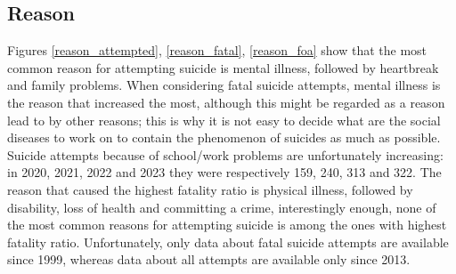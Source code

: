 \documentclass{article}
\begin{document}
\subsection{Reason}
%
%
Figures \ref{reason_attempted}, \ref{reason_fatal}, \ref{reason_foa}
show that the most common reason for attempting suicide 
is mental illness, followed by heartbreak and family problems.
When considering fatal suicide attempts, mental illness is the reason 
that increased the most, although this might be regarded as a reason lead to
by other reasons; this is why it is not easy to decide what are the social
diseases to work on to contain the phenomenon of suicides as much as possible. 
Suicide attempts because of school/work problems are unfortunately increasing: in 2020, 2021, 2022 and 2023
they were respectively 159, 240, 313 and 322.
The reason that caused the highest fatality ratio is physical illness, followed by disability,
loss of health and committing a crime, interestingly enough, none of the most common reasons for attempting
suicide is among the ones with highest fatality ratio.
Unfortunately, only data about fatal suicide attempts are available since 1999,
whereas data about all attempts are available only since 2013.
\end{document}
